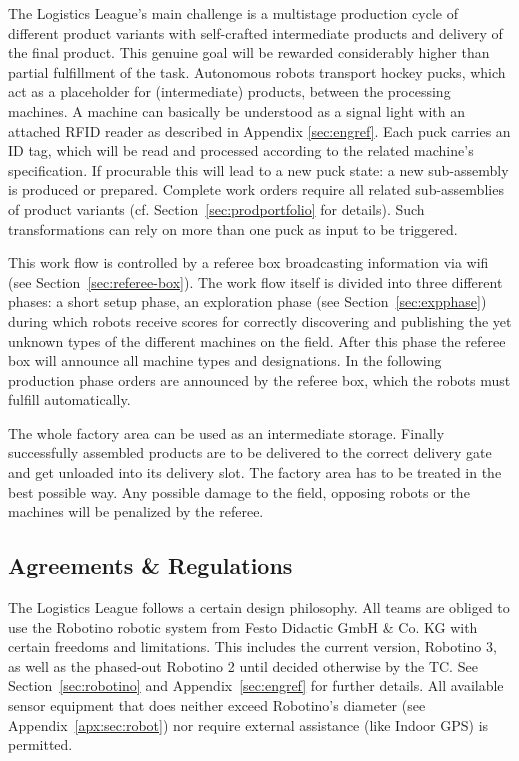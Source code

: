 \documentclass[12pt,twoside]{article}
\newcommand{\refsec}[1]{Section~\ref{#1}}
\begin{document}
The Logistics League's main challenge is a multistage production
cycle of different product variants with self-crafted intermediate
products and delivery of the final product. This genuine goal will be
rewarded considerably higher than partial fulfillment of the task.
Autonomous robots transport hockey pucks, which act as a placeholder
for (intermediate) products, between the processing machines. A machine
can basically be understood as a signal light with an attached RFID
reader as described in Appendix \ref{sec:engref}. Each puck
carries an ID tag, which will be read and processed according to the
related machine's specification. If procurable this will lead to a new
puck state: a new sub-assembly is produced or prepared. Complete
work orders require all related sub-assemblies of product variants (cf.
\refsec{sec:prodportfolio} for details). Such transformations can rely
on more than one puck as input to be triggered.

This work flow is controlled by a referee box broadcasting information
via wifi (see \refsec{sec:referee-box}). The work flow itself is
divided into three different phases: a short setup phase, an
exploration phase (see \refsec{sec:expphase}) during which robots
receive scores for correctly discovering and publishing the yet
unknown types of the different machines on the field. After this phase
the referee box will announce all machine types and designations. In
the following production phase orders are announced by the referee box,
which the robots must fulfill automatically.

The whole factory area can be used as an intermediate storage. Finally
successfully assembled products are to be delivered to the correct
delivery gate and get unloaded into its delivery slot. The factory area
has to be treated in the best possible way. Any possible damage to the
field, opposing robots or the machines will be penalized by the referee.

\subsection{Agreements \& Regulations}
\label{sec:agreements}

The Logistics League follows a certain design philosophy. All teams
are obliged to use the Robotino robotic system from Festo Didactic
GmbH \& Co. KG with certain freedoms and limitations. This includes
the current version, Robotino 3, as well as the phased-out Robotino 2
until decided otherwise by the TC. See \refsec{sec:robotino} and
Appendix~\ref{sec:engref} for further details. All available sensor
equipment that does neither exceed Robotino's diameter (see
Appendix~\ref{apx:sec:robot}) nor require external assistance (like
Indoor GPS) is permitted.
\end{document}
